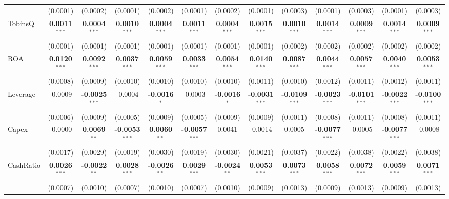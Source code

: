 \begin{landscape}
\begin{table}[H]
\begin{tabular}{lcccccccccccc}
 & (0.0001) & (0.0002) & (0.0001) & (0.0002) & (0.0001) & (0.0002) & (0.0001) & (0.0003) & (0.0001) & (0.0003) & (0.0001) & (0.0003) \\
TobinsQ & \textbf{0.0011}$^{***}$ & \textbf{0.0004}$^{***}$ & \textbf{0.0010}$^{***}$ & \textbf{0.0004}$^{***}$ & \textbf{0.0011}$^{***}$ & \textbf{0.0004}$^{***}$ & \textbf{0.0015}$^{***}$ & \textbf{0.0010}$^{***}$ & \textbf{0.0014}$^{***}$ & \textbf{0.0009}$^{***}$ & \textbf{0.0014}$^{***}$ & \textbf{0.0009}$^{***}$ \\
 & (0.0001) & (0.0001) & (0.0001) & (0.0001) & (0.0001) & (0.0001) & (0.0001) & (0.0002) & (0.0002) & (0.0002) & (0.0002) & (0.0002) \\
ROA & \textbf{0.0120}$^{***}$ & \textbf{0.0092}$^{***}$ & \textbf{0.0037}$^{***}$ & \textbf{0.0059}$^{***}$ & \textbf{0.0033}$^{***}$ & \textbf{0.0054}$^{***}$ & \textbf{0.0140}$^{***}$ & \textbf{0.0087}$^{***}$ & \textbf{0.0044}$^{***}$ & \textbf{0.0057}$^{***}$ & \textbf{0.0040}$^{***}$ & \textbf{0.0053}$^{***}$ \\
 & (0.0008) & (0.0009) & (0.0010) & (0.0010) & (0.0010) & (0.0010) & (0.0011) & (0.0010) & (0.0012) & (0.0011) & (0.0012) & (0.0011) \\
Leverage & -0.0009 & \textbf{-0.0025}$^{***}$ & -0.0004 & \textbf{-0.0016}$^{*}$ & -0.0003 & \textbf{-0.0016}$^{*}$ & \textbf{-0.0031}$^{***}$ & \textbf{-0.0109}$^{***}$ & \textbf{-0.0023}$^{***}$ & \textbf{-0.0101}$^{***}$ & \textbf{-0.0022}$^{***}$ & \textbf{-0.0100}$^{***}$ \\
 & (0.0006) & (0.0009) & (0.0005) & (0.0009) & (0.0005) & (0.0009) & (0.0009) & (0.0011) & (0.0008) & (0.0011) & (0.0008) & (0.0011) \\
Capex & -0.0000 & \textbf{0.0069}$^{**}$ & \textbf{-0.0053}$^{***}$ & \textbf{0.0060}$^{**}$ & \textbf{-0.0057}$^{***}$ & 0.0041 & -0.0014 & 0.0005 & \textbf{-0.0077}$^{***}$ & -0.0005 & \textbf{-0.0077}$^{***}$ & -0.0008 \\
 & (0.0017) & (0.0029) & (0.0019) & (0.0030) & (0.0019) & (0.0030) & (0.0021) & (0.0037) & (0.0022) & (0.0038) & (0.0022) & (0.0038) \\
CashRatio & \textbf{0.0026}$^{***}$ & \textbf{-0.0022}$^{**}$ & \textbf{0.0028}$^{***}$ & \textbf{-0.0026}$^{**}$ & \textbf{0.0029}$^{***}$ & \textbf{-0.0024}$^{**}$ & \textbf{0.0053}$^{***}$ & \textbf{0.0073}$^{***}$ & \textbf{0.0058}$^{***}$ & \textbf{0.0072}$^{***}$ & \textbf{0.0059}$^{***}$ & \textbf{0.0071}$^{***}$ \\
 & (0.0007) & (0.0010) & (0.0007) & (0.0010) & (0.0007) & (0.0010) & (0.0009) & (0.0013) & (0.0009) & (0.0013) & (0.0009) & (0.0013) \\

\end{tabular}
\end{table}
\end{landscape}
